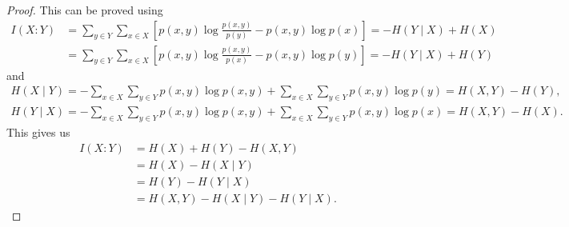 \begin{proof}
	This can be proved using
	\begin{align*}
		I(X\colon Y) & = \sum_{y \in Y}\sum_{x\in X}\left[p(x,y)\log \frac{p(x,y)}{p(y)} - p(x,y)\log p(x)\right] = -H(Y\mid X) + H(X)  \\
		             & = \sum_{y \in Y}\sum_{x\in X}\left[p(x,y)\log \frac{p(x,y)}{p(x)} - p(x,y)\log p(y)\right] = - H(Y\mid X) + H(Y)
	\end{align*}
	and
	\begin{align*}
		H(X\mid Y) = -\sum_{x\in X}\sum_{y\in Y}p(x,y)\log p(x,y) + \sum_{x\in X}\sum_{y \in Y}p(x,y)\log p(y) = H(X,Y) - H(Y), \\
		H(Y\mid X) = -\sum_{x\in X}\sum_{y\in Y}p(x,y)\log p(x,y) + \sum_{x\in X}\sum_{y \in Y}p(x,y)\log p(x) = H(X,Y) - H(X).
	\end{align*}
	This gives us
	\begin{align*}
		I(X\colon Y) & = H(X) + H(Y) - H(X,Y)              \\
		             & = H(X) - H(X\mid Y)                 \\
		             & = H(Y) - H(Y\mid X)                 \\
		             & = H(X,Y) - H(X\mid Y) - H(Y\mid X).
	\end{align*}
\end{proof}
